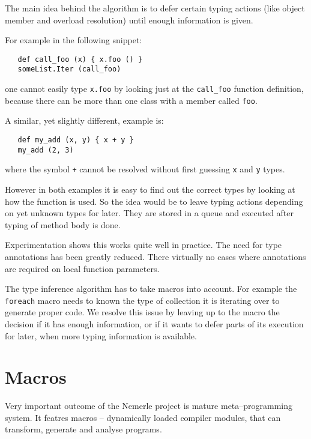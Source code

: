\documentclass{article}
\begin{document}
The main idea behind the algorithm is to defer certain typing actions
(like object member and overload resolution) until enough information
is given.

For example in the following snippet:
\begin{verbatim}
   def call_foo (x) { x.foo () }
   someList.Iter (call_foo)
\end{verbatim}
one cannot easily type \texttt{x.foo} by looking just at the
\texttt{call\_foo} function definition, because there can be
more than one class with a member called \texttt{foo}.

A similar, yet slightly different, example is:
\begin{verbatim}
   def my_add (x, y) { x + y }
   my_add (2, 3)
\end{verbatim}
where the symbol \texttt{+} cannot be resolved without
first guessing \texttt{x} and \texttt{y} types.

However in both examples it is easy to find out the correct
types by looking at how the function is used. So the idea would be
to leave typing actions depending on yet unknown types for later.
They are stored in a queue and executed after typing of method body
is done.

Experimentation shows this works quite well in practice. The need for
type annotations has been greatly reduced. There virtually no cases
where annotations are required on local function parameters.

The type inference algorithm has to take macros into account. For
example the \texttt{foreach} macro needs to known the type of collection
it is iterating over to generate proper code. We resolve this issue
by leaving up to the macro the decision if it has enough information,
or if it wants to defer parts of its execution for later, when
more typing information is available.

\section{Macros}

Very important outcome of the Nemerle project is mature meta--programming
system. It featres macros -- dynamically loaded compiler modules,
that can transform, generate and analyse programs.
\end{document}
